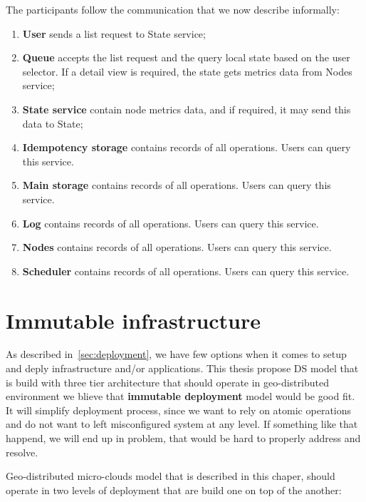 The participants follow the communication that we now describe informally:
\begin{enumerate}[start=1,label={(\bfseries \arabic*)}]
	\item \textbf{User} sends a list request to State service;
	\item \textbf{Queue} accepts the list request and the query local state based on the user selector. If a detail view is required, the state gets metrics data from Nodes service;
	\item \textbf{State service} contain node metrics data, and if required, it may send this data to State;
	\item \textbf{Idempotency storage} contains records of all operations. Users can query this service.
	\item \textbf{Main storage} contains records of all operations. Users can query this service.
	\item \textbf{Log} contains records of all operations. Users can query this service.
	\item \textbf{Nodes} contains records of all operations. Users can query this service.
	\item \textbf{Scheduler} contains records of all operations. Users can query this service.
\end{enumerate}
%
%
\section{Immutable infrastructure}\label{sec:immutable_infrastructure}
%
As described in~\ref{sec:deployment}, we have few options when it comes to setup and deply infrastructure and/or applications. This thesis propose DS model that is build with three tier architecture that should operate in geo-distributed environment we blieve that \textbf{immutable deployment} model would be good fit. It will simplify deployment process, since we want to rely on atomic operations and do not want to left misconfigured system at any level. If something like that happend, we will end up in problem, that would be hard to properly address and resolve.

Geo-distributed micro-clouds model that is described in this chaper, should operate in two levels of deployment that are build one on top of the another:

